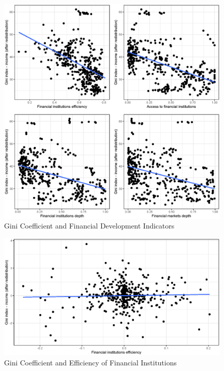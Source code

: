 \documentclass[a4paper,11pt]{article}
\begin{document}
\begin{figure}
    \caption{Gini Coefficient and Financial Development Indicators}
\includegraphics[width=\textwidth, keepaspectratio]{figures/plots_findev_gini}
\end{figure}

%
%

\begin{figure}
    \caption{Gini Coefficient and Efficiency of Financial Institutions}
\includegraphics[width=\textwidth, keepaspectratio]{figures/FIEGiniNet_dm}
\end{figure}
\end{document}

